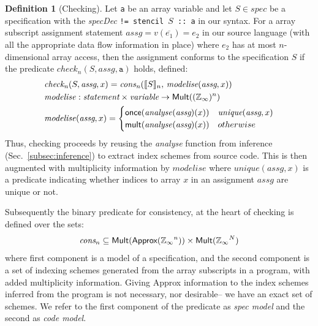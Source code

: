 \documentclass[9pt,preprint]{sigplanconf}
\newcounter{block}
\theoremstyle{definition}
\newtheorem{definition}[block]{Definition}
\newcommand{\interp}[1]{\llbracket{#1}\rrbracket}
\begin{document}
\begin{definition}[Checking]
Let \texttt{a} be an array variable and let
$S \in \textit{spec}$ be a specification with
the \textit{specDec} \texttt{!= stencil
  $S$ :: a} in our syntax.
For a array subscript
assignment statement $\textit{assg} = v(\overline{e_1}) = e_2$ in our source language
(with all the appropriate data flow information in place)
where $e_2$ has at most $n$-dimensional array access, 
then the assignment conforms to the specification $S$ if 
the predicate $\mathit{check}_n(S, \textit{assg}, \texttt{a})$ holds, 
defined:
\begin{align*}
& \mathit{check_n}(S, \textit{assg}, x) =
  \mathit{cons_n}(\interp{S}_n, \, \textit{modelise}(\textit{assg},
  x)) \\
& \mathit{modelise} : \textit{statement} \times \textit{variable}
  \rightarrow \textsf{Mult}((\domainVal)^n) \\ 
& \mathit{modelise} (\textit{assg}, x) =
  \begin{cases}
    \textsf{once}(\mathit{analyse}(\textit{assg})(x)) & \textit{unique}(\textit{assg},x) \\
    \textsf{mult}(\mathit{analyse}(\textit{assg})(x)) & otherwise
  \end{cases}
\end{align*}
Thus, checking proceeds by reusing the \textit{analyse} function from 
inference (Sec.~\ref{subsec:inference}) to extract index 
schemes from source code. 
This is then augmented with multiplicity information
by $\mathit{modelise}$ where $\mathit{unique}(\textit{assg},x)$ is a
 predicate indicating whether indices to array $x$ in an
assignment $\textit{assg}$ are unique or not. 
\end{definition}

Subsequently the binary predicate for consistency, at the heart of checking
is defined over the sets: 
%
\begin{equation*}
\textit{cons}_n \subseteq \textsf{Mult}(\textsf{Approx}(\mathbb{Z}_\infty{}^n))
\times \textsf{Mult}(\mathbb{Z}_\infty{}^N)
\end{equation*}
%
where first component is a model of a specification,
and the second component is a set of indexing schemes generated from
the array subscripts in a program, with added multiplicity
information. Giving \textsf{Approx} information to the
index schemes inferred from the program is not necessary, nor
desirable-- we have an exact set of schemes. We refer to the first
component of the predicate as \emph{spec model} and the second as \emph{code model}. 
\end{document}
